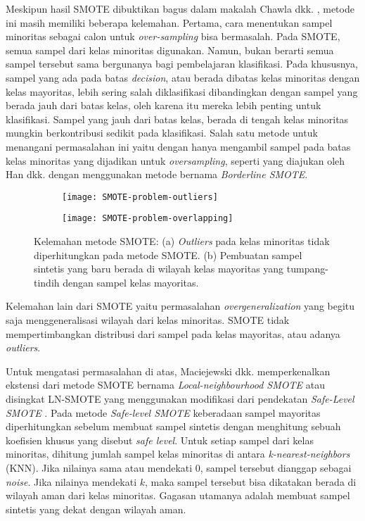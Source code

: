 Meskipun hasil SMOTE dibuktikan bagus dalam makalah Chawla dkk.
\cite{chawla2002smote}, metode ini masih memiliki beberapa kelemahan.
Pertama, cara menentukan sampel minoritas sebagai calon untuk
\textit{over-sampling} bisa bermasalah.
Pada SMOTE, semua sampel dari kelas minoritas digunakan.
Namun, bukan berarti semua sampel tersebut sama bergunanya bagi pembelajaran
klasifikasi.
Pada khususnya, sampel yang ada pada batas \textit{decision}, atau berada
dibatas kelas minoritas dengan kelas mayoritas, lebih sering salah
diklasifikasi dibandingkan dengan sampel yang berada jauh dari batas kelas,
oleh karena itu mereka lebih penting untuk klasifikasi.
Sampel yang jauh dari batas kelas, berada di tengah kelas minoritas mungkin
berkontribusi sedikit pada klasifikasi.
Salah satu metode untuk menangani permasalahan ini yaitu dengan hanya
mengambil sampel pada batas kelas minoritas yang dijadikan untuk
\textit{oversampling}, seperti yang diajukan oleh Han dkk.
\cite{han2005borderline} dengan menggunakan metode bernama \textit{Borderline
SMOTE}.

\begin{figure}[b!]
	\centering
	\begin{subfigure}[b]{0.4\textwidth}
		\centering
		\texttt{[image: SMOTE-problem-outliers]}
		\caption{}
		\label{fig:smote-outliers}
	\end{subfigure}
	\begin{subfigure}[b]{0.5\textwidth}
		\centering
		\texttt{[image: SMOTE-problem-overlapping]}
		\caption{}
		\label{fig:smote-overlapping}
	\end{subfigure}
	\caption{
Kelemahan metode SMOTE:
(a) \textit{Outliers} pada kelas minoritas tidak diperhitungkan pada metode
SMOTE.
(b) Pembuatan sampel sintetis yang baru berada di wilayah kelas mayoritas
yang tumpang-tindih dengan sampel kelas mayoritas.
	}
	\label{fig:smote-problems}
\end{figure}

Kelemahan lain dari SMOTE yaitu permasalahan \textit{overgeneralization} yang
begitu saja menggeneralisasi wilayah dari kelas minoritas.
SMOTE tidak mempertimbangkan distribusi dari sampel pada kelas mayoritas, atau
adanya \textit{outliers}.

Untuk mengatasi permasalahan di atas, Maciejewski dkk. memperkenalkan ekstensi
dari metode SMOTE bernama \textit{Local-neighbourhood SMOTE} atau disingkat
LN-SMOTE \cite{maciejewski2011local} yang menggunakan modifikasi dari
pendekatan \textit{Safe-Level SMOTE} \cite{bunkhumpornpat2009safe}.
Pada metode \textit{Safe-level SMOTE} keberadaan sampel mayoritas
diperhitungkan sebelum membuat sampel sintetis dengan menghitung sebuah
koefisien khusus yang disebut \textit{safe level}.
Untuk setiap sampel dari kelas minoritas, dihitung jumlah sampel kelas
minoritas di antara \textit{k-nearest-neighbors} (KNN).
Jika nilainya sama atau mendekati $ 0 $, sampel tersebut dianggap sebagai
\textit{noise}.
Jika nilainya mendekati $ k $, maka sampel tersebut bisa dikatakan berada
di wilayah aman dari kelas minoritas.
Gagasan utamanya adalah membuat sampel sintetis yang dekat dengan wilayah aman.


